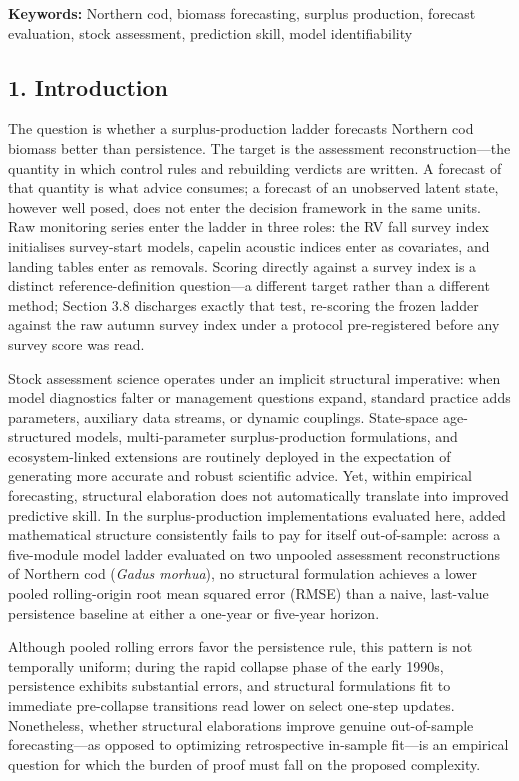 \documentclass[11pt]{article}
\begin{document}
\textbf{Keywords:} Northern cod, biomass forecasting, surplus
production, forecast evaluation, stock assessment, prediction skill,
model identifiability

\subsection{1. Introduction}\label{introduction}

The question is whether a surplus-production ladder forecasts Northern
cod biomass better than persistence. The target is the assessment
reconstruction---the quantity in which control rules and rebuilding
verdicts are written. A forecast of that quantity is what advice
consumes; a forecast of an unobserved latent state, however well posed,
does not enter the decision framework in the same units. Raw monitoring
series enter the ladder in three roles: the RV fall survey index
initialises survey-start models, capelin acoustic indices enter as
covariates, and landing tables enter as removals. Scoring directly
against a survey index is a distinct reference-definition question---a
different target rather than a different method; Section 3.8 discharges
exactly that test, re-scoring the frozen ladder against the raw autumn
survey index under a protocol pre-registered before any survey score was
read.

Stock assessment science operates under an implicit structural
imperative: when model diagnostics falter or management questions
expand, standard practice adds parameters, auxiliary data streams, or
dynamic couplings. State-space age-structured models, multi-parameter
surplus-production formulations, and ecosystem-linked extensions are
routinely deployed in the expectation of generating more accurate and
robust scientific advice. Yet, within empirical forecasting, structural
elaboration does not automatically translate into improved predictive
skill. In the surplus-production implementations evaluated here, added
mathematical structure consistently fails to pay for itself
out-of-sample: across a five-module model ladder evaluated on two
unpooled assessment reconstructions of Northern cod (\emph{Gadus
morhua}), no structural formulation achieves a lower pooled
rolling-origin root mean squared error (RMSE) than a naive, last-value
persistence baseline at either a one-year or five-year horizon.

Although pooled rolling errors favor the persistence rule, this pattern
is not temporally uniform; during the rapid collapse phase of the early
1990s, persistence exhibits substantial errors, and structural
formulations fit to immediate pre-collapse transitions read lower on
select one-step updates. Nonetheless, whether structural elaborations
improve genuine out-of-sample forecasting---as opposed to optimizing
retrospective in-sample fit---is an empirical question for which the
burden of proof must fall on the proposed complexity.
\end{document}
